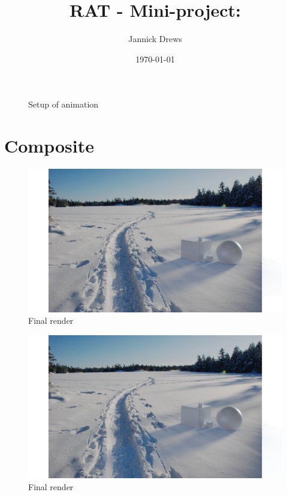 \documentclass{article}
\title{RAT - Mini-project:}
\author{Jannick Drews}
\date{\today}
\begin{document}
\maketitle
\newpage
{}

\begin{figure}[H]
	\centering
	\caption{Setup of animation}
	\label{fig:animation_setup}
\end{figure}

\section{Composite}
\begin{figure}[H]
	\centering
	\includegraphics[width=\textwidth]{img/RAT.png}
	\caption{Final render}
	\label{fig:final_render}
\end{figure}

\begin{figure}[H]
	\centering
	\includegraphics[width=\textwidth]{img/tried_to_fix.png}
	\caption{Final render}
	\label{fig:final_render}
\end{figure}
\end{document}
